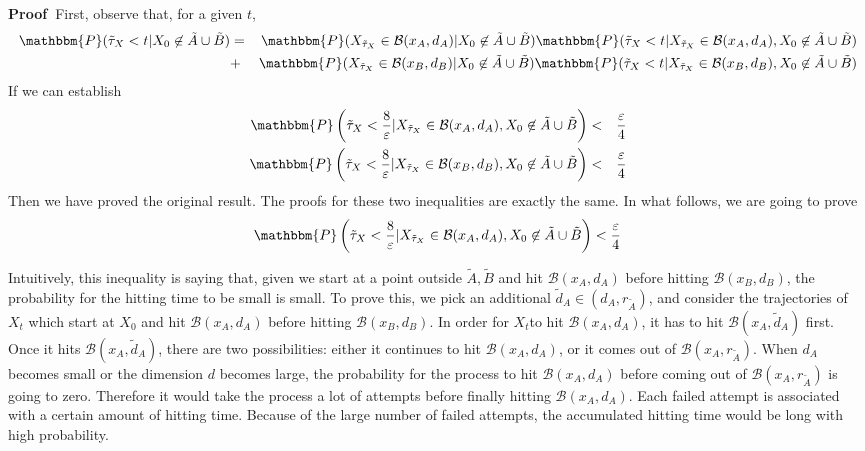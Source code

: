\documentclass[english, aip, jcp, priprint, graphicx]{revtex4-1}
\newcommand{\nin}{\not\in}
\theoremstyle{plain}
\theoremstyle{definition}
\theoremstyle{plain}
\begin{document}
\noindent\textbf{Proof\ }First, observe that, for a given $t$,
\begin{eqnarray*}
\mathbbm{P} (\tilde{\tau}_X < t|X_0 \nin \tilde{A} \cup \tilde{B}) & = &
\mathbbm{P} (X_{\tilde{\tau}_X} \in \mathcal{B} (x_A, d_A) |X_0 \nin
\tilde{A} \cup \tilde{B}) \mathbbm{P} (\tilde{\tau}_X < t|X_{\tilde{\tau}_X}
\in \mathcal{B} (x_A, d_A), X_0 \nin \tilde{A} \cup \tilde{B})\\
& + & \mathbbm{P} (X_{\tilde{\tau}_X} \in \mathcal{B} (x_B, d_B) |X_0 \nin
\tilde{A} \cup \tilde{B}) \mathbbm{P} (\tilde{\tau}_X < t|X_{\tilde{\tau}_X}
\in \mathcal{B} (x_B, d_B), X_0 \nin \tilde{A} \cup \tilde{B})
\end{eqnarray*}
If we can establish
\begin{eqnarray*}
\mathbbm{P} \left( \tilde{\tau}_X < \frac{8}{\varepsilon}
|X_{\tilde{\tau}_X} \in \mathcal{B} (x_A, d_A), X_0 \nin \tilde{A} \cup
\tilde{B} \right) & < & \frac{\varepsilon}{4}\\
\mathbbm{P} \left( \tilde{\tau}_X < \frac{8}{\varepsilon}
|X_{\tilde{\tau}_X} \in \mathcal{B} (x_B, d_B), X_0 \nin \tilde{A} \cup
\tilde{B} \right) & < & \frac{\varepsilon}{4}
\end{eqnarray*}
Then we have proved the original result. The proofs for these two inequalities
are exactly the same. In what follows, we are going to prove
\[ \mathbbm{P} \left( \tilde{\tau}_X < \frac{8}{\varepsilon}
|X_{\tilde{\tau}_X} \in \mathcal{B} (x_A, d_A), X_0 \nin \tilde{A} \cup
\tilde{B} \right) < \frac{\varepsilon}{4} \]


Intuitively, this inequality is saying that, given we start at a point outside
$\tilde{A}, \tilde{B}$ and hit $\mathcal{B} (x_A, d_A)$ before hitting
$\mathcal{B} (x_B, d_B)$, the probability for the hitting time to be small is
small. To prove this, we pick an additional $\tilde{d}_A \in (d_A,
r_{\tilde{A}})$, and consider the trajectories of $X_t$ which start at $X_0$
and hit $\mathcal{B} (x_A, d_A)$ before hitting $\mathcal{B} (x_B, d_B)$. In
order for $X_t $to hit $\mathcal{B} (x_A, d_A)$, it has to hit $\mathcal{B}
(x_A, \tilde{d}_A)$ first. Once it hits $\mathcal{B} (x_A, \tilde{d}_A)$,
there are two possibilities: either it continues to hit $\mathcal{B} (x_A,
d_A)$, or it comes out of $\mathcal{B} (x_A, r_{\tilde{A}})$. When $d_A$
becomes small or the dimension $d$ becomes large, the probability for the
process to hit $\mathcal{B} (x_A, d_A)$ before coming out of $\mathcal{B}
(x_A, r_{\tilde{A}})$ is going to zero. Therefore it would take the process a
lot of attempts before finally hitting $\mathcal{B} (x_A, d_A)$. Each failed
attempt is associated with a certain amount of hitting time. Because of the
large number of failed attempts, the accumulated hitting time would be long
with high probability.
\end{document}
